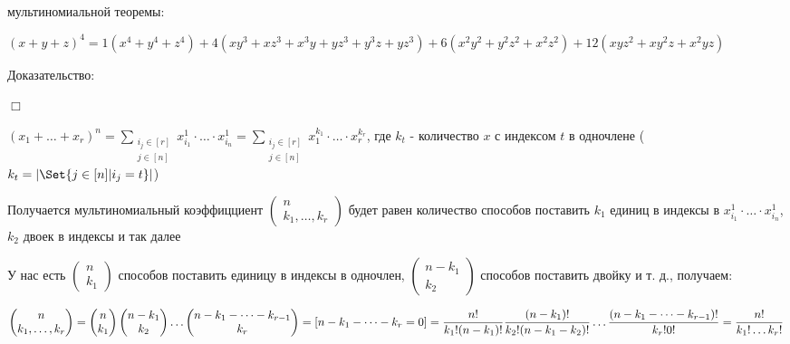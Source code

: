 \documentclass[12pt]{article}
\begin{document}
    \Ex мультиномиальной теоремы:

    $\displaystyle (x + y + z)^4 = 1 (x^4 + y^4 + z^4) + 4 (xy^3 + xz^3 + x^3y + yz^3 + y^3z + yz^3) +
    6(x^2y^2 + y^2z^2 + x^2z^2) + 12 (xyz^2 + xy^2z + x^2yz)$

    Доказательство:

    $\Box$

    $\displaystyle (x_1 + \dots + x_r)^n = \sum_{\substack{i_j \in [r] \\ j \in [n]}} x_{i_1}^1 \cdot \dots \cdot x_{i_n}^1 =
    \sum_{\substack{i_j \in [r] \\ j \in [n]}} x_1^{k_1} \cdot \dots \cdot x_r^{k_r}$, где $\displaystyle k_t$ - количество $x$ с индексом $t$ в одночлене ($\displaystyle k_t = |\Set{j \in [n] | i_j = t}|$)

    Получается мультиномиальный коэффицциент $\displaystyle \begin{pmatrix}
                                                  n \\ k_1, \dots, k_r
    \end{pmatrix}$
    будет равен количество способов поставить $\displaystyle k_1$ единиц в индексы в $\displaystyle x_{i_1}^1 \cdot \dots \cdot x_{i_n}^1$, $\displaystyle k_2$ двоек в индексы и так далее

    У нас есть $\displaystyle \begin{pmatrix}
                    n \\ k_1
    \end{pmatrix}$ способов поставить единицу в индексы в одночлен,
    $\displaystyle \begin{pmatrix}
         n - k_1 \\ k_2
    \end{pmatrix}$ способов поставить двойку и т. д., получаем:

    $\displaystyle \begin{pmatrix}
         n \\ k_1, \dots, k_r
    \end{pmatrix} = \begin{pmatrix}
                        n \\ k_1
    \end{pmatrix} \begin{pmatrix}
                      n - k_1 \\ k_2
    \end{pmatrix} \dots \begin{pmatrix}
                            n - k_1 - \dots - k_{r - 1} \\ k_r
    \end{pmatrix} = [n - k_1 - \dots - k_r = 0] = \\
    \frac{n!}{k_1! (n - k_1)!} \frac{(n - k_1)!}{k_2! (n - k_1 - k_2)!} \dots \frac{(n - k_1 - \dots - k_{r - 1})!}{k_r! 0!} = \frac{n!}{k_1! \dots k_r!}$
\end{document}
